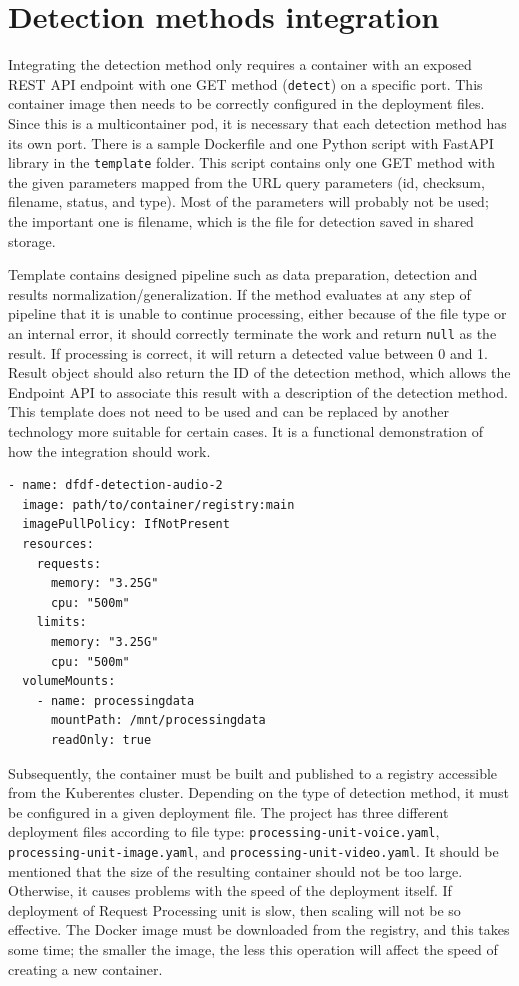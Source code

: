 \chapter{Detection methods integration}

Integrating the detection method only requires a container with an exposed REST API endpoint with one GET method (\texttt{detect}) on a specific port. This container image then needs to be correctly configured in the deployment files. Since this is a multicontainer pod, it is necessary that each detection method has its own port. There is a sample Dockerfile and one Python script with FastAPI library in the \texttt{template} folder. This script contains only one GET method with the given parameters mapped from the URL query parameters (id, checksum, filename, status, and type). Most of the parameters will probably not be used; the important one is filename, which is the file for detection saved in shared storage.

Template contains designed pipeline such as data preparation, detection and results normalization/generalization. If the method evaluates at any step of pipeline that it is unable to continue processing, either because of the file type or an internal error, it should correctly terminate the work and return \texttt{null} as the result. If processing is correct, it will return a detected value between 0 and 1. Result object should also return the ID of the detection method, which allows the Endpoint API to associate this result with a description of the detection method. This template does not need to be used and can be replaced by another technology more suitable for certain cases. It is a functional demonstration of how the integration should work.

\begin{lstlisting}[caption={Container configuration in Kubernates manifest},label={list:detection_method_manifest}]
- name: dfdf-detection-audio-2
  image: path/to/container/registry:main
  imagePullPolicy: IfNotPresent
  resources:
    requests:
      memory: "3.25G"
      cpu: "500m"
    limits:
      memory: "3.25G"
      cpu: "500m"
  volumeMounts:
    - name: processingdata
      mountPath: /mnt/processingdata
      readOnly: true
\end{lstlisting}

Subsequently, the container must be built and published to a registry accessible from the Kuberentes cluster. Depending on the type of detection method, it must be configured in a given deployment file. The project has three different deployment files according to file type: \texttt{processing-unit-voice.yaml}, \texttt{processing-unit-image.yaml}, and \texttt{processing-unit-video.yaml}. It should be mentioned that the size of the resulting container should not be too large. Otherwise, it causes problems with the speed of the deployment itself. If deployment of Request Processing unit is slow, then scaling will not be so effective. The Docker image must be downloaded from the registry, and this takes some time; the smaller the image, the less this operation will affect the speed of creating a new container.

